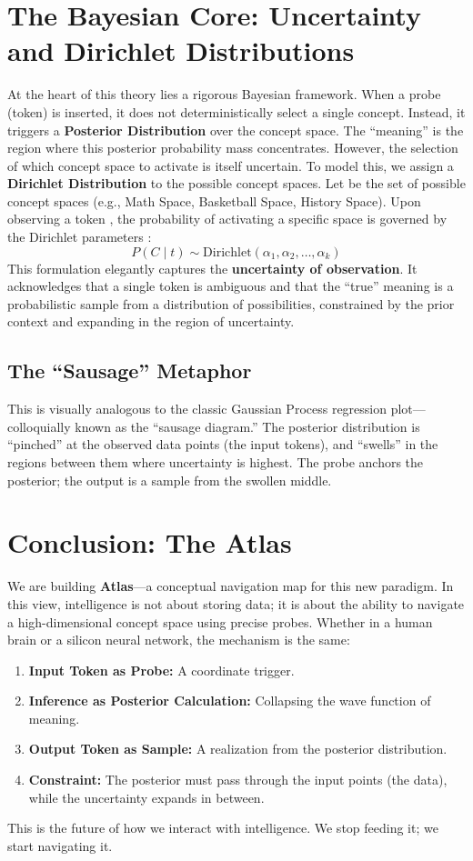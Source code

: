 \documentclass[12pt, a4paper]{article}
\begin{document}
\section{The Bayesian Core: Uncertainty and Dirichlet Distributions}
At the heart of this theory lies a rigorous Bayesian framework.
When a probe (token) is inserted, it does not deterministically select a single concept. Instead, it triggers a \textbf{Posterior Distribution} over the concept space. The ``meaning'' is the region where this posterior probability mass concentrates.
However, the selection of which concept space to activate is itself uncertain. To model this, we assign a \textbf{Dirichlet Distribution} to the possible concept spaces.
Let     be the set of possible concept spaces (e.g., Math Space, Basketball Space, History Space). Upon observing a token    , the probability of activating a specific space     is governed by the Dirichlet parameters    :
\begin{equation}
P(C \mid t) \sim \text{Dirichlet}(\alpha_1, \alpha_2, \ldots, \alpha_k)
\end{equation}
This formulation elegantly captures the \textbf{uncertainty of observation}. It acknowledges that a single token is ambiguous and that the ``true'' meaning is a probabilistic sample from a distribution of possibilities, constrained by the prior context and expanding in the region of uncertainty.
\subsection{The ``Sausage'' Metaphor}
This is visually analogous to the classic Gaussian Process regression plot---colloquially known as the ``sausage diagram.'' The posterior distribution is ``pinched'' at the observed data points (the input tokens), and ``swells'' in the regions between them where uncertainty is highest. The probe anchors the posterior; the output is a sample from the swollen middle.
\section{Conclusion: The Atlas}
We are building \textbf{Atlas}---a conceptual navigation map for this new paradigm.
In this view, intelligence is not about storing data; it is about the ability to navigate a high-dimensional concept space using precise probes. Whether in a human brain or a silicon neural network, the mechanism is the same:
\begin{enumerate}
\item \textbf{Input Token as Probe:} A coordinate trigger.
\item \textbf{Inference as Posterior Calculation:} Collapsing the wave function of meaning.
\item \textbf{Output Token as Sample:} A realization from the posterior distribution.
\item \textbf{Constraint:} The posterior must pass through the input points (the data), while the uncertainty expands in between.
\end{enumerate}
This is the future of how we interact with intelligence. We stop feeding it; we start navigating it.
\end{document}
